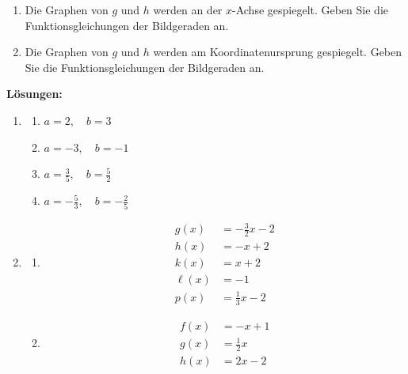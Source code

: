 \begin{ueb}
\begin{enumerate}
\begin{enumerate}
                  \item Die Graphen von \(g\) und \(h\) werden an der
                        \(x\)-Achse gespiegelt.
                        Geben Sie die Funktionsgleichungen der Bildgeraden an.

                  \item Die Graphen von \(g\) und \(h\) werden am
                        Koordinatenursprung gespiegelt.
                        Geben Sie die Funktionsgleichungen der Bildgeraden an.
              \end{enumerate}
    \end{enumerate}
\end{ueb}

\clearpage
\textbf{Lösungen:}
\begin{enumerate}
    \item
          \begin{enumerate}
              \item \(a=2,\quad b=3\)
              \item \(a=-3,\quad b=-1\)
              \item \(a=\frac35,\quad b=\frac52\)
              \item \(a=-\frac53,\quad b=-\frac25\)
          \end{enumerate}

    \item
          \begin{enumerate}
              \item
                    \[
                        \begin{aligned}
                            g(x)    & =-\frac32x-2 \\
                            h(x)    & =-x+2        \\
                            k(x)    & =x+2         \\
                            \ell(x) & =-1          \\
                            p(x)    & =\frac13x-2
                        \end{aligned}
                    \]

              \item
                    \[
                        \begin{aligned}
                            f(x) & =-x+1     \\
                            g(x) & =\frac12x \\
                            h(x) & =2x-2
                        \end{aligned}
                    \]
          \end{enumerate}


\end{enumerate}
